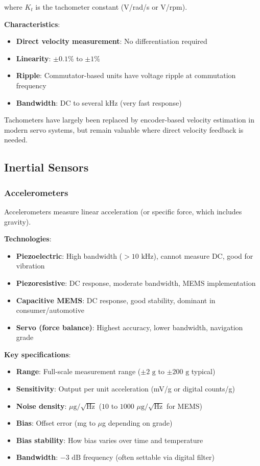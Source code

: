 where $K_t$ is the tachometer constant (V/rad/s or V/rpm).

\textbf{Characteristics}:
\begin{itemize}
    \item \textbf{Direct velocity measurement}: No differentiation required
    \item \textbf{Linearity}: $\pm 0.1\%$ to $\pm 1\%$
    \item \textbf{Ripple}: Commutator-based units have voltage ripple at commutation frequency
    \item \textbf{Bandwidth}: DC to several kHz (very fast response)
\end{itemize}

Tachometers have largely been replaced by encoder-based velocity estimation in modern servo systems, but remain valuable where direct velocity feedback is needed.

\subsection{Inertial Sensors}

\subsubsection{Accelerometers}

Accelerometers measure linear acceleration (or specific force, which includes gravity).

\textbf{Technologies}:
\begin{itemize}
    \item \textbf{Piezoelectric}: High bandwidth ($>10\text{ kHz}$), cannot measure DC, good for vibration
    \item \textbf{Piezoresistive}: DC response, moderate bandwidth, MEMS implementation
    \item \textbf{Capacitive MEMS}: DC response, good stability, dominant in consumer/automotive
    \item \textbf{Servo (force balance)}: Highest accuracy, lower bandwidth, navigation grade
\end{itemize}

\textbf{Key specifications}:
\begin{itemize}
    \item \textbf{Range}: Full-scale measurement range ($\pm 2\text{ g}$ to $\pm 200\text{ g}$ typical)
    \item \textbf{Sensitivity}: Output per unit acceleration (mV/g or digital counts/g)
    \item \textbf{Noise density}: $\mu\text{g}/\sqrt{\text{Hz}}$ ($10$ to $1000$ $\mu\text{g}/\sqrt{\text{Hz}}$ for MEMS)
    \item \textbf{Bias}: Offset error (mg to $\mu$g depending on grade)
    \item \textbf{Bias stability}: How bias varies over time and temperature
    \item \textbf{Bandwidth}: $-3\text{ dB}$ frequency (often settable via digital filter)
\end{itemize}

